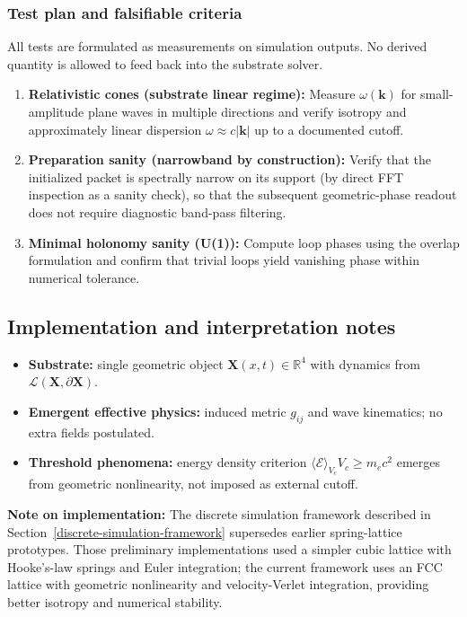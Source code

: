 \subsubsection{Test plan and falsifiable criteria}
\label{falsifiable-criteria}

All tests are formulated as measurements on simulation outputs. No derived
quantity is allowed to feed back into the substrate solver.

\begin{enumerate}
\item \textbf{Relativistic cones (substrate linear regime):}
Measure $\omega(\mathbf k)$ for small-amplitude plane waves in multiple
directions and verify isotropy and approximately linear dispersion
$\omega\approx c|\mathbf k|$ up to a documented cutoff.

\item \textbf{Preparation sanity (narrowband by construction):}
Verify that the initialized packet is spectrally narrow on its support (by direct FFT inspection as a sanity check),
so that the subsequent geometric-phase readout does not require diagnostic band-pass filtering.

\item \textbf{Minimal holonomy sanity (U(1)):}
Compute loop phases using the overlap formulation and confirm that trivial loops yield vanishing phase within numerical tolerance.
\end{enumerate}

\subsection{Implementation and interpretation notes}

\begin{itemize}
\item \textbf{Substrate:} single geometric object $\mathbf X(x,t)\in\mathbb R^4$ with dynamics from $\mathcal L(\mathbf X,\partial\mathbf X)$.
\item \textbf{Emergent effective physics:} induced metric $g_{ij}$ and wave kinematics; no extra fields postulated.
\item \textbf{Threshold phenomena:} energy density criterion $\langle\mathcal E\rangle_{V_c}V_c \ge m_e c^2$ emerges from geometric nonlinearity, not imposed as external cutoff.
\end{itemize}

\textbf{Note on implementation:} The discrete simulation framework described in Section~\ref{discrete-simulation-framework} supersedes earlier spring-lattice prototypes. Those preliminary implementations used a simpler cubic lattice with Hooke's-law springs and Euler integration; the current framework uses an FCC lattice with geometric nonlinearity and velocity-Verlet integration, providing better isotropy and numerical stability.

